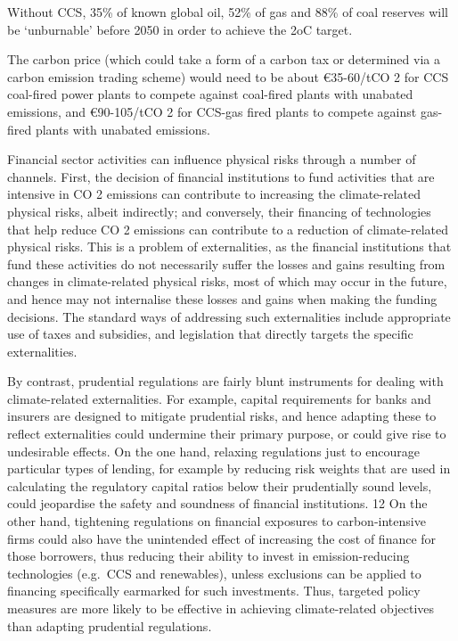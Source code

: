 \documentclass[
]{book}
\begin{document}
Without CCS, 35\% of known global oil, 52\% of gas and 88\% of coal reserves will
be `unburnable' before 2050 in order to achieve the 2oC target.

The carbon price (which could take a form of a carbon tax or determined via a carbon
emission trading scheme) would need to be about €35-60/tCO 2 for CCS coal-fired power plants
to compete against coal-fired plants with unabated emissions, and €90-105/tCO 2 for CCS-gas
fired plants to compete against gas-fired plants with unabated emissions.

Financial sector activities can influence physical risks through a number of channels. First, the
decision of financial institutions to fund activities that are intensive in CO 2 emissions can
contribute to increasing the climate-related physical risks, albeit indirectly; and conversely, their
financing of technologies that help reduce CO 2 emissions can contribute to a reduction of
climate-related physical risks. This is a problem of externalities, as the financial institutions that
fund these activities do not necessarily suffer the losses and gains resulting from changes in
climate-related physical risks, most of which may occur in the future, and hence may not
internalise these losses and gains when making the funding decisions. The standard ways of
addressing such externalities include appropriate use of taxes and subsidies, and legislation that
directly targets the specific externalities.

By contrast, prudential regulations are fairly blunt instruments for dealing with climate-related
externalities. For example, capital requirements for banks and insurers are designed to mitigate
prudential risks, and hence adapting these to reflect externalities could undermine their primary
purpose, or could give rise to undesirable effects.
On the one hand, relaxing regulations just to
encourage particular types of lending, for example by reducing risk weights that are used in
calculating the regulatory capital ratios below their prudentially sound levels, could jeopardise
the safety and soundness of financial institutions. 12 On the other hand, tightening regulations on
financial exposures to carbon-intensive firms could also have the unintended effect of increasing
the cost of finance for those borrowers, thus reducing their ability to invest in emission-reducing
technologies (e.g.~CCS and renewables), unless exclusions can be applied to financing
specifically earmarked for such investments. Thus, targeted policy measures are more likely to
be effective in achieving climate-related objectives than adapting prudential regulations.
\end{document}
